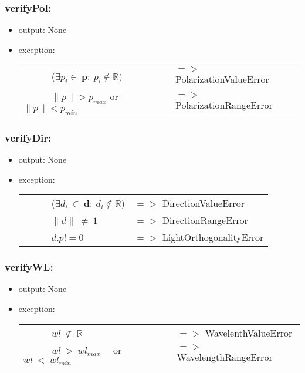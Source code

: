 \documentclass[12pt, titlepage]{article}
\begin{document}
\subsubsection*{verifyPol:}
\begin{itemize}
	\item output: None
	\item exception: 
		\begin{longtable*}[l]{l l}
		\ \ \ \ \ \ ($\exists p_i \in\ \textbf{p}:\ p_i \notin \mathbb{R})$ & $=>$ PolarizationValueError\\
		\ \ \ \ \ \ $\|p\| > p_{max}$ or $\|p\| < p_{min}$  & $=>$ PolarizationRangeError\\
	\end{longtable*}

\end{itemize}

\subsubsection*{verifyDir:}
\begin{itemize}
	\item output: None
	\item exception: 
	\noindent \begin{longtable*}[l]{l l}
		\ \ \ \ \ \ ($\exists d_i\  \in \ \textbf{d}:\ d_i \notin \mathbb{R})$ & $=>$ DirectionValueError\\
		\ \ \ \ \ \ $\|d\|\ \neq\ 1$ & $=>$ DirectionRangeError\\
		\ \ \ \ \ \ $d . p != 0$ & $=>$ LightOrthogonalityError\\
	\end{longtable*}
	
\end{itemize}

\subsubsection*{verifyWL:}
\begin{itemize}
	\item output: None
	\item exception: 
	\noindent \begin{longtable*}[l]{l l}
		\ \ \ \ \ \ $wl\  \notin \  \mathbb{R}$ & $=>$ WavelenthValueError\\
		\ \ \ \ \ \ $ wl\ >\ wl_{max}$ \ \ or \ \ $wl\ <\ wl_{min}$ & $=>$ WavelengthRangeError\\
	\end{longtable*}
	
\end{itemize}
\end{document}
